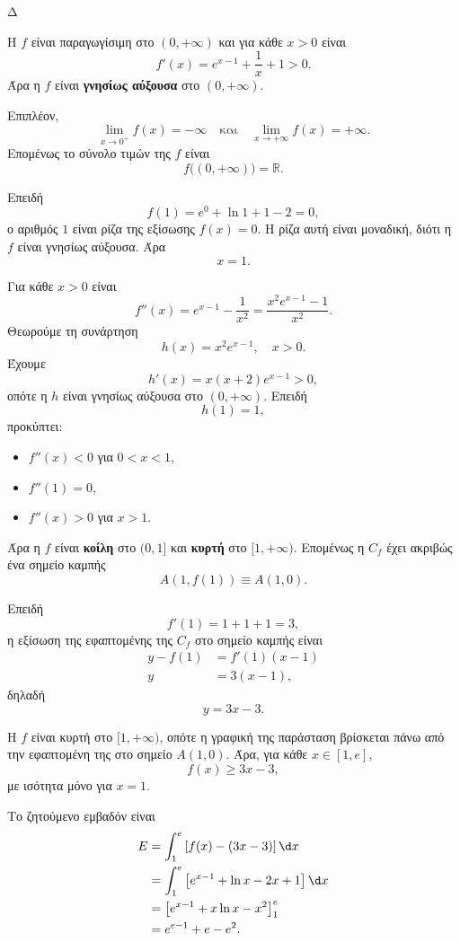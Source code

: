 \begin{thema}{Δ}
\begin{erwthma}
\item Η $f$ είναι παραγωγίσιμη στο $(0,+\infty)$ και για κάθε $x>0$ είναι
\[
f'(x)=e^{x-1}+\frac{1}{x}+1>0.
\]
Άρα η $f$ είναι \textbf{γνησίως αύξουσα} στο $(0,+\infty)$.

Επιπλέον,
\[
\lim_{x\to0^+}f(x)=-\infty
\quad\text{και}\quad
\lim_{x\to+\infty}f(x)=+\infty.
\]
Επομένως το σύνολο τιμών της $f$ είναι
\[
{f\big((0,+\infty)\big)=\mathbb{R}}.
\]

Επειδή
\[
f(1)=e^0+\ln1+1-2=0,
\]
ο αριθμός $1$ είναι ρίζα της εξίσωσης $f(x)=0$. Η ρίζα αυτή είναι μοναδική, διότι η $f$ είναι γνησίως αύξουσα. Άρα
\[
{x=1}.
\]

\item Για κάθε $x>0$ είναι
\[
f''(x)=e^{x-1}-\frac{1}{x^2}
=\frac{x^2e^{x-1}-1}{x^2}.
\]
Θεωρούμε τη συνάρτηση
\[
h(x)=x^2e^{x-1},\quad x>0.
\]
Έχουμε
\[
h'(x)=x(x+2)e^{x-1}>0,
\]
οπότε η $h$ είναι γνησίως αύξουσα στο $(0,+\infty)$. Επειδή
\[
h(1)=1,
\]
προκύπτει:
\begin{itemize}
\item $f''(x)<0$ για $0<x<1$,
\item $f''(1)=0$,
\item $f''(x)>0$ για $x>1$.
\end{itemize}
Άρα η $f$ είναι \textbf{κοίλη} στο $(0,1]$ και \textbf{κυρτή} στο $[1,+\infty)$. Επομένως η $C_f$ έχει ακριβώς ένα σημείο καμπής
\[
{A(1,f(1))\equiv A(1,0)}.
\]

Επειδή
\[
f'(1)=1+1+1=3,
\]
η εξίσωση της εφαπτομένης της $C_f$ στο σημείο καμπής είναι
\begin{align*}
y-f(1)&=f'(1)(x-1)\\
y&=3(x-1),
\end{align*}
δηλαδή
\[
{y=3x-3}.
\]

\item Η $f$ είναι κυρτή στο $[1,+\infty)$, οπότε η γραφική της παράσταση βρίσκεται πάνω από την εφαπτομένη της στο σημείο $A(1,0)$. Άρα, για κάθε $x\in[1,e]$,
\[
f(x)\geq3x-3,
\]
με ισότητα μόνο για $x=1$.

Το ζητούμενο εμβαδόν είναι
\begin{align*}
E
&=\int_1^e\left[f(x)-(3x-3)\right]\d x\\
&=\int_1^e
\left[e^{x-1}+\ln x-2x+1\right]\d x\\
&=\left[e^{x-1}+x\ln x-x^2\right]_1^e\\
&={e^{e-1}+e-e^2}.
\end{align*}


\end{erwthma}
\end{thema}
